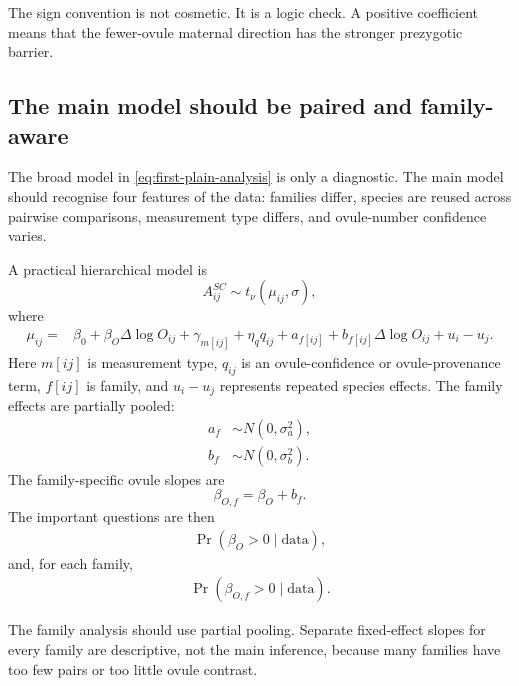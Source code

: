 \documentclass[12pt]{article}
\begin{document}
\begin{conclusionbox}
The sign convention is not cosmetic. It is a logic check. A positive coefficient means that the fewer-ovule maternal direction has the stronger prezygotic barrier.
\end{conclusionbox}

\subsection{The main model should be paired and family-aware}

The broad model in \eqref{eq:first-plain-analysis} is only a diagnostic. The main model should recognise four features of the data: families differ, species are reused across pairwise comparisons, measurement type differs, and ovule-number confidence varies.

A practical hierarchical model is
\begin{equation}
A^{SC}_{ij}\sim t_{\nu}(\mu_{ij},\sigma),
\label{eq:t-main-analysis}
\end{equation}
where
\begin{align}
\mu_{ij}={}&\beta_0+
\beta_O\Delta\log O_{ij}
+\gamma_{m[ij]}
+\eta_q q_{ij}
+a_{f[ij]}
+b_{f[ij]}\Delta\log O_{ij}
+u_i-u_j .
\label{eq:main-analysis-mu}
\end{align}
Here $m[ij]$ is measurement type, $q_{ij}$ is an ovule-confidence or ovule-provenance term, $f[ij]$ is family, and $u_i-u_j$ represents repeated species effects. The family effects are partially pooled:
\begin{align}
a_f&\sim N(0,\sigma_a^2),\\
b_f&\sim N(0,\sigma_b^2).
\end{align}
The family-specific ovule slopes are
\begin{equation}
\beta_{O,f}=\beta_O+b_f.
\end{equation}
The important questions are then
\begin{align}
\Pr(\beta_O>0\mid \mathrm{data}),
\end{align}
and, for each family,
\begin{align}
\Pr(\beta_{O,f}>0\mid \mathrm{data}).
\end{align}

\begin{cautionbox}
The family analysis should use partial pooling. Separate fixed-effect slopes for every family are descriptive, not the main inference, because many families have too few pairs or too little ovule contrast.
\end{cautionbox}
\end{document}
